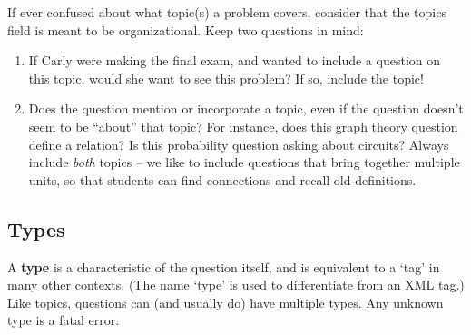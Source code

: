     If ever confused about what topic(s) a problem covers, consider that the topics field is meant to be organizational. Keep two questions in mind:
    
    \begin{enumerate}[1.]\itemsep0pt
      \item If Carly were making the final exam, and wanted to include a question on this topic, would she want to see this problem? If so, include the topic!
      \item Does the question mention or incorporate a topic, even if the question doesn't seem to be ``about'' that topic? For instance, does this graph theory question define a relation? Is this probability question asking about circuits? Always include \textit{both} topics -- we like to include questions that bring together multiple units, so that students can find connections and recall old definitions.
    \end{enumerate}
  
  \subsection{Types}
    A \textbf{type} is a characteristic of the question itself, and is equivalent to a `tag' in many other contexts. (The name `type' is used to differentiate from an XML tag.) Like topics, questions can (and usually do) have multiple types. Any unknown type is a fatal error.
    
